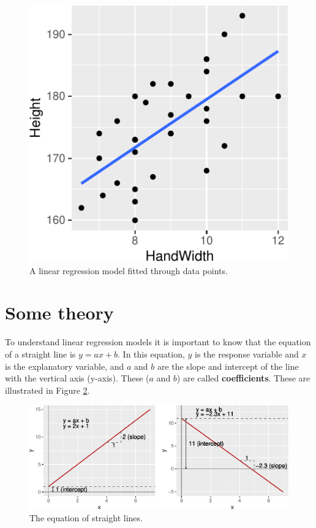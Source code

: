 \documentclass[
  a4paperpaper,
]{book}
\begin{document}
\begin{figure}[ht]

{\centering \includegraphics{BB852_files/figure-latex/exampleRegression-1} 

}

\caption{A linear regression model fitted through data points.}\label{fig:exampleRegression}
\end{figure}

\hypertarget{some-theory}{%
\section{Some theory}\label{some-theory}}

To understand linear regression models it is important to know that the equation of a straight line is \(y = ax+b\). In this equation, \(y\) is the response variable and \(x\) is the explanatory variable, and \(a\) and \(b\) are the slope and intercept of the line with the vertical axis (y-axis). These (\(a\) and \(b\)) are called \textbf{coefficients}. These are illustrated in Figure \ref{fig:lineEquation}.

\begin{figure}[ht]

{\centering \includegraphics{BB852_files/figure-latex/lineEquation-1} 

}

\caption{The equation of straight lines.}\label{fig:lineEquation}
\end{figure}
\end{document}
